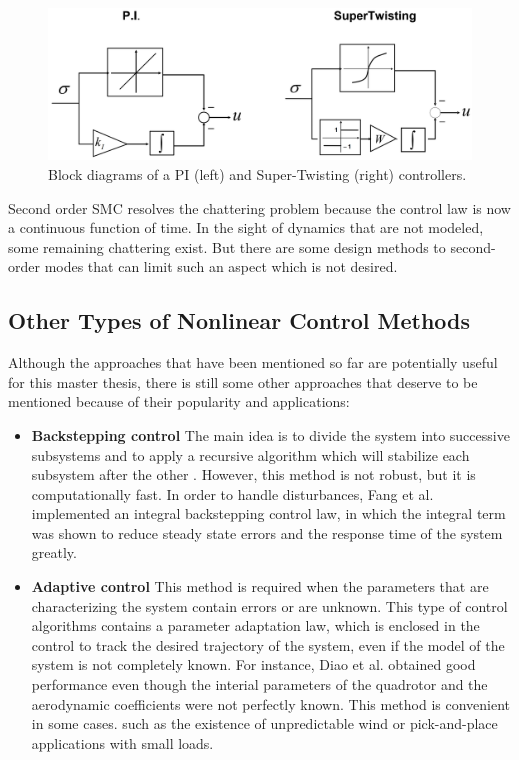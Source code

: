 \documentclass{thesisreport}
\begin{document}
\begin{figure}[h]
\centering
\includegraphics[width=\textwidth]{Images/Control/PI_SuperTwisting}
\caption{Block diagrams of a PI (left) and Super-Twisting (right) controllers.\cite{DeCarlo2008}}
\label{PI_SuperTwisting}
\end{figure}



\noindent Second order SMC resolves the chattering problem because the control law is now a continuous function of time. 
In the sight of dynamics that are not modeled, some remaining chattering exist. But there are some design methods to second-order modes that can limit such an aspect which is not desired.

\newpage

 \subsection{Other Types of Nonlinear Control Methods}
 
Although the approaches that have been mentioned so far are potentially useful for this master thesis, there is still some other approaches that deserve to be mentioned because of their popularity and applications:


\begin{itemize}
\setlength{\itemindent}{-.5in}
	\item [] \textbf{Backstepping control} The main idea is to divide the system into successive subsystems and to apply a recursive algorithm which will stabilize each subsystem after the other \cite{Madani2006}. However, this method is not robust, but it is computationally fast. In order to handle disturbances, Fang et al. \cite{Gao2011} implemented an integral backstepping control law, in which the integral term was shown to reduce steady state errors and the response time of the system greatly. 

	\item [] \textbf{Adaptive control} This method is required when the parameters that are characterizing the system contain errors or are unknown. This type of control algorithms contains a parameter adaptation law, which is enclosed in the control to track the desired trajectory of the system, even if the model of the system is not completely known.
For instance, Diao et al. \cite{Diao2011} obtained good performance even though the interial parameters of the quadrotor and the aerodynamic coefficients were not perfectly known.
This method is convenient in some cases. such as the existence of unpredictable wind \cite{Antonelli2013} or pick-and-place applications with small loads. 
	 
 \end{itemize}
 
\end{document}
